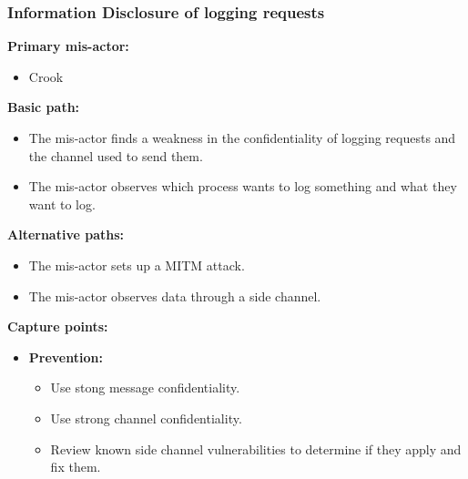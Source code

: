 \documentclass[a4paper,11pt]{report}
\begin{document}
\subsubsection{Information Disclosure of logging requests}
\textbf{Primary mis-actor:}
\begin{itemize}
\item Crook
\end{itemize}
\textbf{Basic path:}
\begin{itemize}
\item The mis-actor finds a weakness in the confidentiality of logging requests and the channel used to send them.
\item The mis-actor observes which process wants to log something and what they want to log.
\end{itemize}
\textbf{Alternative paths:}
\begin{itemize}
\item The mis-actor sets up a MITM attack.
\item The mis-actor observes data through a side channel.
\end{itemize}
\textbf{Capture points:}
\begin{itemize}
\item \textbf{Prevention:}
\begin{itemize}
\item Use stong message confidentiality.
\item Use strong channel confidentiality.
\item Review known side channel vulnerabilities to determine if they apply and fix them.
\end{itemize}
\end{itemize}
\end{document}
